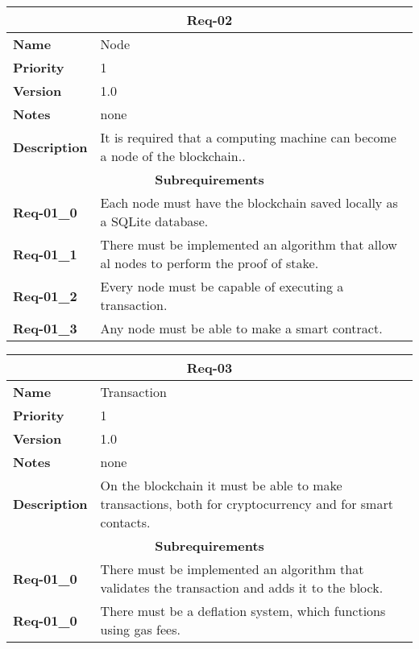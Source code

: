 \documentclass{article}
\begin{document}
\bgroup{}
\def\arraystretch{1.25}
\begin{center}
    \begin{tabular}{ |l|p{9cm}| }
        \hline
        \multicolumn{2}{|c|}{\textbf{Req-02}} \\
        \hline
        \textbf{Name} & Node \\
        \hline
        \textbf{Priority} & 1 \\
        \hline
        \textbf{Version} & 1.0 \\
        \hline
        \textbf{Notes} & none \\
        \hline
        \textbf{Description} & It is required that a computing machine can become a node of the blockchain.. \\
        \hline
        \multicolumn{2}{|c|}{\textbf{Subrequirements}} \\
        \hline
        \textbf{Req-01\_0} & Each node must have the blockchain saved locally as a SQLite database. \\
        \hline
        \textbf{Req-01\_1} & There must be implemented an algorithm that allow al nodes to perform the proof of stake. \\
        \hline
        \textbf{Req-01\_2} & Every node must be capable of executing a transaction. \\
        \hline
        \textbf{Req-01\_3} & Any node must be able to make a smart contract. \\
        \hline
    \end{tabular}
\end{center}
\egroup{}

\bgroup{}
\def\arraystretch{1.25}
\begin{center}
    \begin{tabular}{ |l|p{9cm}| }
        \hline
        \multicolumn{2}{|c|}{\textbf{Req-03}} \\
        \hline
        \textbf{Name} & Transaction \\
        \hline
        \textbf{Priority} & 1 \\
        \hline
        \textbf{Version} & 1.0 \\
        \hline
        \textbf{Notes} & none \\
        \hline
        \textbf{Description} & On the blockchain it must be able to make transactions, both for cryptocurrency and for smart contacts. \\
        \hline
        \multicolumn{2}{|c|}{\textbf{Subrequirements}} \\
        \hline
        \textbf{Req-01\_0} & There must be implemented an algorithm that validates the transaction and adds it to the block. \\
        \hline
        \textbf{Req-01\_0} & There must be a deflation system, which functions using gas fees. \\
        \hline
    \end{tabular}
\end{center}
\egroup{}
\end{document}

